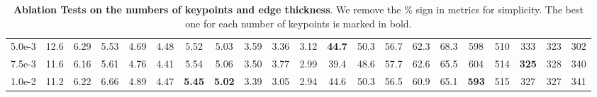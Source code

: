 \documentclass{article}
\begin{document}
\begin{table}[h]
{\begin{tabular}{|c|c|c|c|c|c|c|c|c|c|c|c|c|c|c|c|c|c|c|c|c|}
    5.0e-3 & 12.6 & 6.29 & 5.53 & 4.69 & 4.48 & 5.52 & 5.03 & 3.59 & 3.36 & 3.12 & \textbf{44.7} & 50.3 & 56.7 & 62.3 & 68.3 & 598 & 510 & 333 & 323 & 302 \\
    7.5e-3 & 11.6 & 6.16 & 5.61 & 4.76 & 4.41 & 5.54 & 5.06 & 3.50 & 3.77 & 2.99 & 39.4 & 48.6 & 57.7 & 62.6 & 65.5 & 604 & 514 & \textbf{325} & 328 & 340 \\
    1.0e-2 & 11.2 & 6.22 & 6.66 & 4.89 & 4.47 & \textbf{5.45} & \textbf{5.02} & 3.39 & 3.05 & 2.94 & 44.6 & 50.3 & 56.5 & 60.9 & 65.1 & \textbf{593} & 515 & 327 & 327 & 341 \\ \hline
\end{tabular}
}
\caption{\textbf{Ablation Tests on the numbers of keypoints and edge thickness}. We remove the \% sign in metrics for simplicity. The best one for each number of keypoints is marked in bold.} 
\label{tab:hyper}
\end{table}
\end{document}
